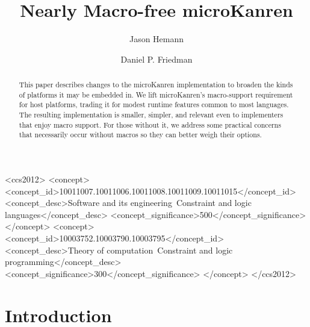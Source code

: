 \documentclass[sigplan,draft,balance,pbalance,natbib=false]{acmart}
\begin{document}
\title{Nearly Macro-free microKanren}

\author{Jason Hemann}
\author{Daniel P. Friedman}

\renewcommand{\shortauthors}{Hemann et al.}

\begin{abstract}

  This paper describes changes to the microKanren implementation to
  broaden the kinds of platforms it may be embedded in. We lift
  microKanren's macro-support requirement for host platforms, trading
  it for modest runtime features common to most languages. The
  resulting implementation is smaller, simpler, and relevant even to
  implementers that enjoy macro support. For those without it, we
  address some practical concerns that necessarily occur without
  macros so they can better weigh their options.

\end{abstract}

\begin{CCSXML}
<ccs2012>
   <concept>
       <concept_id>10011007.10011006.10011008.10011009.10011015</concept_id>
       <concept_desc>Software and its engineering~Constraint and logic languages</concept_desc>
       <concept_significance>500</concept_significance>
   </concept>
   <concept>
       <concept_id>10003752.10003790.10003795</concept_id>
       <concept_desc>Theory of computation~Constraint and logic programming</concept_desc>
       <concept_significance>300</concept_significance>
   </concept>
 </ccs2012>
\end{CCSXML}



\maketitle

\section{Introduction}
\end{document}
